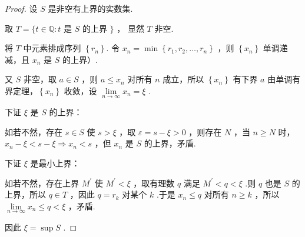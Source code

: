 \begin{proof}
	设 $S$ 是非空有上界的实数集.
	
	取 $T=\{t \in \mathbb{Q}: t$ 是 $S$ 的上界 $\}$ ，
	显然 $T$ 非空.
	
	将 $T$ 中元素排成序列 $\left\{r_n\right\}$.
	令 $x_n=\min \left\{r_1, r_2, \ldots, r_n\right\}$ ，则 $\left\{x_n\right\}$ 单调递减，且 $x_n$ 是 $S$ 的上界）.
	
	又 $S$ 非空，取 $a \in S$ ，则 $a \leqslant x_n$ 对所有 $n$ 成立，所以 $\left\{x_n\right\}$ 有下界 $a$
	由单调有界定理，$\left\{x_n\right\}$ 收敛，设 $\lim\limits_{n\rightarrow\infty}x_n=\xi$ .
	
	下证 $\xi$ 是 $S$ 的上界：
	
	如若不然，存在 $s \in S$ 使 $s>\xi$ ，取 $\varepsilon=s-\xi>0$ ，则存在 $N$ ，当 $n \geqslant N$ 时，$x_n-\xi<s-\xi\Rightarrow x_n<s$ ，但 $x_n$ 是 $S$ 的上界，矛盾.
	
	下证 $\xi$ 是最小上界：
	
	如若不然，存在上界 $M^{\prime}$ 使 $M^{\prime}<\xi$ ，取有理数 $q$ 满足 $M^{\prime}<q<\xi$ .则 $q$ 也是 $S$ 的上界，所以 $q \in T$ ，因此 $q=r_k$ 对某个 $k$ .于是 $x_n \leqslant q$ 对所有 $n \geqslant k$ ，所以 $\lim\limits_{n\rightarrow\infty} x_n \leqslant q<\xi$ ，矛盾.
	
	因此 $\xi=\sup S$ .
\end{proof}
